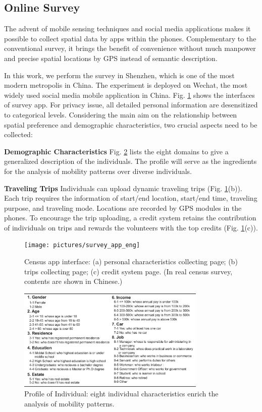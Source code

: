 \documentclass{ieeeaccess}
\begin{document}
\subsection{Online Survey}

The advent of mobile sensing techniques and social media applications makes it possible to collect spatial data by apps within the phones. Complementary to the conventional survey, it brings the benefit of convenience without much manpower and precise spatial locations by GPS instead of semantic description.

In this work, we perform the survey in Shenzhen, which is one of the most modern metropolis in China. The experiment is deployed on Wechat, the most widely used social media mobile application in China. Fig. \ref{fig:app} shows the interfaces of survey app. For privacy issue, all detailed personal information are desensitized to categorical levels. Considering the main aim on the relationship between spatial preference and demographic characteristics, two crucial aspects need to be collected:

\textbf{Demographic Characteristics} Fig. \ref{fig:data_over} lists the eight domains to give a generalized description of the individuals. The profile will serve as the ingredients for the analysis of mobility patterns over diverse individuals.

\textbf{Traveling Trips} Individuals can upload dynamic traveling trips (Fig. \ref{fig:app}(b)). Each trip requires the information of start/end location, start/end time, traveling purpose, and traveling mode. Locations are recorded by GPS modules in the phones. To encourage the trip uploading, a credit system retains the contribution of individuals on trips and rewards the volunteers with the top credits (Fig. \ref{fig:app}(c)).


\begin{figure}
 \centering
 \texttt{[image: pictures/survey\_app\_eng]}
  \captionsetup{justification=centering}
 \caption{Census app interface: (a) personal characteristics collecting page; (b) trips collecting page; (c) credit system page. (In real census survey, contents are shown in Chinese.)}
 \label{fig:app}
\end{figure}


\begin{figure}
 \centering
 \includegraphics[width=9cm]{pictures/data_over}
 \captionsetup{justification=centering}
 \caption{Profile of Individual: eight individual characteristics enrich the analysis of mobility patterns.}
 \label{fig:data_over}
\end{figure}
\end{document}
